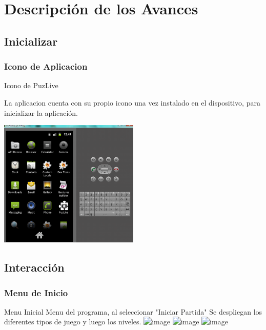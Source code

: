 \documentclass[serif,11pt]{beamer}
\begin{document}
		

	\section{Descripci\'on de los Avances} 
		\subsection{Inicializar}


		\begin{frame}
			\frametitle{Icono de Aplicacion}

			\begin{block}{Icono de PuzLive}
					
				La aplicacion cuenta con su propio icono una vez instalado en el dispositivo, para inicializar la aplicaci\'on.
					
						\includegraphics[width=0.5\textwidth]{outmenu} 
						\bigskip
				
				\end{block}
		\end{frame}




		\subsection{Interacci\'on}
		\begin{frame}
			\frametitle{Menu de Inicio}
				\begin{block}{Menu Inicial}
				Menu del programa, al seleccionar "Iniciar Partida" Se despliegan los diferentes tipos de juego y luego los niveles.
				\includegraphics<1>[height=5cm]{menuPrin} 
				\includegraphics<2>[height=5cm]{dosgame} 
				\includegraphics<3>[height=5cm]{niveles} 
				\end{block}
		\end{frame}

		
		
\end{document}
